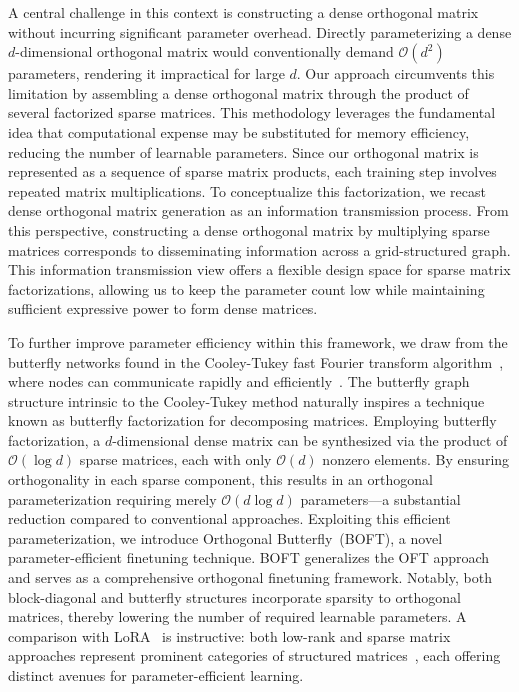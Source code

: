 A central challenge in this context is constructing a dense orthogonal matrix without incurring significant parameter overhead. Directly parameterizing a dense $d$-dimensional orthogonal matrix would conventionally demand $\mathcal{O}(d^2)$ parameters, rendering it impractical for large $d$. Our approach circumvents this limitation by assembling a dense orthogonal matrix through the product of several factorized sparse matrices. This methodology leverages the fundamental idea that computational expense may be substituted for memory efficiency, reducing the number of learnable parameters. Since our orthogonal matrix is represented as a sequence of sparse matrix products, each training step involves repeated matrix multiplications. To conceptualize this factorization, we recast dense orthogonal matrix generation as an information transmission process. From this perspective, constructing a dense orthogonal matrix by multiplying sparse matrices corresponds to disseminating information across a grid-structured graph. This information transmission view offers a flexible design space for sparse matrix factorizations, allowing us to keep the parameter count low while maintaining sufficient expressive power to form dense matrices.

To further improve parameter efficiency within this framework, we draw from the butterfly networks found in the Cooley-Tukey fast Fourier transform algorithm~\cite{cooley1965algorithm}, where nodes can communicate rapidly and efficiently~\cite{klasing1994broadcasting}. The butterfly graph structure intrinsic to the Cooley-Tukey method naturally inspires a technique known as butterfly factorization for decomposing matrices. Employing butterfly factorization, a $d$-dimensional dense matrix can be synthesized via the product of $\mathcal{O}(\log d)$ sparse matrices, each with only $\mathcal{O}(d)$ nonzero elements. By ensuring orthogonality in each sparse component, this results in an orthogonal parameterization requiring merely $\mathcal{O}(d \log d)$ parameters—a substantial reduction compared to conventional approaches. Exploiting this efficient parameterization, we introduce Orthogonal Butterfly~(BOFT), a novel parameter-efficient finetuning technique. BOFT generalizes the OFT approach and serves as a comprehensive orthogonal finetuning framework. Notably, both block-diagonal and butterfly structures incorporate sparsity to orthogonal matrices, thereby lowering the number of required learnable parameters. A comparison with LoRA~\cite{hulora2022} is instructive: both low-rank and sparse matrix approaches represent prominent categories of structured matrices~\cite{candes2011robust}, each offering distinct avenues for parameter-efficient learning.

